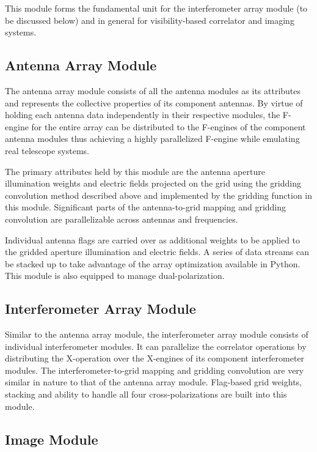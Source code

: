 \documentclass[a4paper,fleqn,usenatbib]{mnras}
\begin{document}
This module forms the fundamental unit for the interferometer array module (to be discussed below) and in general for visibility-based correlator and imaging systems. 

\subsection{Antenna Array Module}

The antenna array module consists of all the antenna modules as its attributes and represents the collective properties of its component antennas. By virtue of holding each antenna data independently in their respective modules, the F-engine for the entire array can be distributed to the F-engines of the component antenna modules thus achieving a highly parallelized F-engine while emulating real telescope systems.

The primary attributes held by this module are the antenna aperture illumination weights and electric fields projected on the grid using the gridding convolution method described above and implemented by the gridding function in this module. Significant parts of the antenna-to-grid mapping and gridding convolution are parallelizable across antennas and frequencies.

Individual antenna flags are carried over as additional weights to be applied to the gridded aperture illumination and electric fields. A series of data streams can be stacked up to take advantage of the array optimization available in Python. This module is also equipped to manage dual-polarization. 

\subsection{Interferometer Array Module}

Similar to the antenna array module, the interferometer array module consists of individual interferometer modules. It can parallelize the correlator operations by distributing the X-operation over the X-engines of its component interferometer modules. The interferometer-to-grid mapping and gridding convolution are very similar in nature to that of the antenna array module. Flag-based grid weights, stacking and ability to handle all four cross-polarizations are built into this module. 

\subsection{Image Module}
\end{document}
